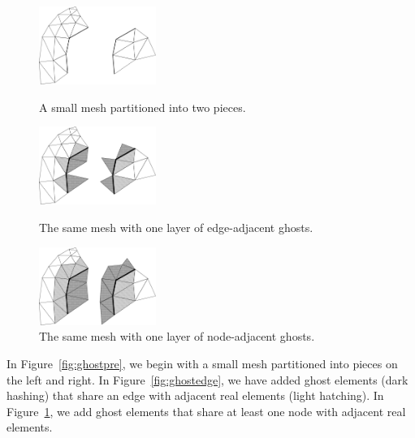 \begin{figure}
\begin{center}
\includegraphics[width=1.5in]{fig/ghost_pre}
\end{center}
\caption{A small mesh partitioned into two pieces.}
\label{fig:ghostpre}


\begin{center}
\includegraphics[width=1.5in]{fig/ghost_edge}
\end{center}
\caption{The same mesh with one layer of edge-adjacent ghosts.}
\label{fig:ghostedge}


\begin{center}
\includegraphics[width=1.5in]{fig/ghost_node}
\end{center}
\caption{The same mesh with one layer of node-adjacent ghosts.}
\label{fig:ghostnode}
\end{figure}


In Figure~\ref{fig:ghostpre}, we begin with a small mesh partitioned
into pieces on the left and right.  In Figure~\ref{fig:ghostedge},
we have added ghost elements (dark hashing) that share an edge with
adjacent real elements (light hatching).  In Figure~\ref{fig:ghostnode},
we add ghost elements that share at least one node with adjacent 
real elements.



